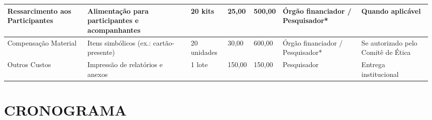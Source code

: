 \documentclass[
  brazilian,
  12pt,
  letterpaper,
  DIV=11,
  numbers=noendperiod]{scrartcl}
\begin{document}
\begin{table}[htbp]
\begin{tabular}{|p{1.8cm}|p{2.7cm}|p{1.4cm}|p{1.6cm}|p{1.6cm}|p{2.4cm}|p{2.2cm}|}
Ressarcimento aos Participantes & Alimentação para participantes e acompanhantes & 20 kits & 25,00 & 500,00 & Órgão financiador / Pesquisador* & Quando aplicável \\ \hline

Compensação Material & Itens simbólicos (ex.: cartão-presente) & 20 unidades & 30,00 & 600,00 & Órgão financiador / Pesquisador* & Se autorizado pelo Comitê de Ética \\ \hline

Outros Custos & Impressão de relatórios e anexos & 1 lote & 150,00 & 150,00 & Pesquisador & Entrega institucional \\ \hline

\end{tabular}
\end{table}

\section{CRONOGRAMA}\label{cronograma}
\end{document}
